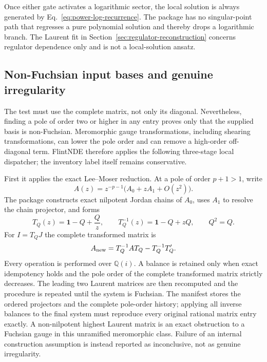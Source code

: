 \documentclass[11pt]{article}
\newcommand{\Id}{\mathbf 1}
\renewcommand{\_}{\origunderscore\allowbreak}
\begin{document}
 Once either gate activates a logarithmic sector, the local solution is always generated by
Eq.~\eqref{eq:power-log-recurrence}.  The package has no singular-point path that regresses a
pure polynomial solution and thereby drops a logarithmic branch.  The Laurent fit in
Section~\ref{sec:regulator-reconstruction} concerns regulator dependence only and is not a
local-solution ansatz.

\subsection{Non-Fuchsian input bases and genuine irregularity}
\label{subsec:nonfuchsian}

The test must use the complete matrix, not only its diagonal.  Nevertheless, finding a pole
of order two or higher in any entry proves only that the supplied basis is non-Fuchsian.
Meromorphic gauge transformations, including shearing transformations, can lower the pole
order and can remove a high-order off-diagonal term.  FlintNDE therefore applies the
following three-stage local dispatcher; the inventory label itself remains conservative.

First it applies the exact Lee--Moser reduction.  At a pole of order $p+1>1$, write
\begin{equation}
 A(z)=z^{-p-1}\bigl(A_0+zA_1+O(z^2)\bigr).
\end{equation}
The package constructs exact nilpotent Jordan chains of $A_0$, uses $A_1$ to resolve the
chain projector, and forms
\begin{equation}
 T_Q(z)=\Id-Q+\frac{Q}{z},\qquad
 T_Q^{-1}(z)=\Id-Q+zQ,\qquad Q^2=Q.
 \label{eq:moser-balance}
\end{equation}
For $I=T_QJ$ the complete transformed matrix is
\begin{equation}
 A_{\rm new}=T_Q^{-1}A T_Q-T_Q^{-1}T_Q'.
 \label{eq:moser-transformed-system}
\end{equation}
Every operation is performed over $\mathbb Q(i)$.  A balance is retained only when exact
idempotency holds and the pole order of the complete transformed matrix strictly decreases.
The leading two Laurent matrices are then recomputed and the procedure is repeated until the
system is Fuchsian.  The manifest stores the ordered projectors and the complete pole-order
history; applying all inverse balances to the final system must reproduce every original
rational matrix entry exactly.  A non-nilpotent highest Laurent matrix is an exact obstruction
to a Fuchsian gauge in this unramified meromorphic class.  Failure of an internal construction
assumption is instead reported as inconclusive, not as genuine irregularity.
\end{document}
